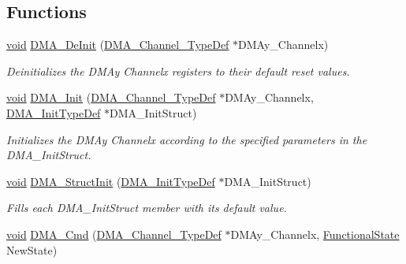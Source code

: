 \subsection*{Functions}
\begin{DoxyCompactItemize}
\item 
\hyperlink{usb__devapi_8h_afabf60e7f57651d6d595a02c75f07cd0}{void} \hyperlink{group___d_m_a___exported___functions_ga21ca0d50b13e502db5ab5feb484f9ece}{D\+M\+A\+\_\+\+De\+Init} (\hyperlink{struct_d_m_a___channel___type_def}{D\+M\+A\+\_\+\+Channel\+\_\+\+Type\+Def} $\ast$D\+M\+Ay\+\_\+\+Channelx)
\begin{DoxyCompactList}\small\item\em Deinitializes the D\+M\+Ay Channelx registers to their default reset values. \end{DoxyCompactList}\item 
\hyperlink{usb__devapi_8h_afabf60e7f57651d6d595a02c75f07cd0}{void} \hyperlink{group___d_m_a___exported___functions_ga7c3d1b9dc041f8e5f2cfc8d5dd858278}{D\+M\+A\+\_\+\+Init} (\hyperlink{struct_d_m_a___channel___type_def}{D\+M\+A\+\_\+\+Channel\+\_\+\+Type\+Def} $\ast$D\+M\+Ay\+\_\+\+Channelx, \hyperlink{struct_d_m_a___init_type_def}{D\+M\+A\+\_\+\+Init\+Type\+Def} $\ast$D\+M\+A\+\_\+\+Init\+Struct)
\begin{DoxyCompactList}\small\item\em Initializes the D\+M\+Ay Channelx according to the specified parameters in the D\+M\+A\+\_\+\+Init\+Struct. \end{DoxyCompactList}\item 
\hyperlink{usb__devapi_8h_afabf60e7f57651d6d595a02c75f07cd0}{void} \hyperlink{group___d_m_a___exported___functions_ga0f7f95f750a90a6824f4e9b6f58adc7e}{D\+M\+A\+\_\+\+Struct\+Init} (\hyperlink{struct_d_m_a___init_type_def}{D\+M\+A\+\_\+\+Init\+Type\+Def} $\ast$D\+M\+A\+\_\+\+Init\+Struct)
\begin{DoxyCompactList}\small\item\em Fills each D\+M\+A\+\_\+\+Init\+Struct member with its default value. \end{DoxyCompactList}\item 
\hyperlink{usb__devapi_8h_afabf60e7f57651d6d595a02c75f07cd0}{void} \hyperlink{group___d_m_a___exported___functions_ga8e7cb6b9ae5f142e2961df879cdaba65}{D\+M\+A\+\_\+\+Cmd} (\hyperlink{struct_d_m_a___channel___type_def}{D\+M\+A\+\_\+\+Channel\+\_\+\+Type\+Def} $\ast$D\+M\+Ay\+\_\+\+Channelx, \hyperlink{agilefox_2library_2inc_2stm32f10x__type_8h_ac9a7e9a35d2513ec15c3b537aaa4fba1}{Functional\+State} New\+State)

\end{DoxyCompactItemize}
